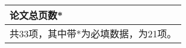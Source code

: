\begin{table}[!h]
\begin{tabular}{|p{2.6cm}|p{2.6cm}|p{2.6cm}|p{3cm}|p{2.5cm}|}
\hline
论文总页数\hspace{-0.01em}*    & \multicolumn{4}{p{5.4cm}|}{  }   \\%
\hline
\multicolumn{5}{|p{13.1cm}|}{ 共33项，其中带\hspace{-0.01em}*\hspace{-0.01em}为必填数据，为21项。 }  \\



\hline 
\end{tabular}	
\end{table}





















